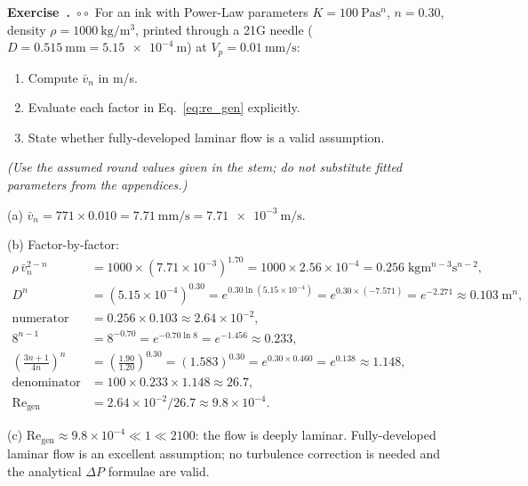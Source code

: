 \documentclass[11pt,a4paper]{article}
\newcommand{\diffB}{\textcolor{orange!80!black}{$\circ\circ$}}
\newcounter{exidx}[section]
\renewcommand{\theexidx}{\thesection.\arabic{exidx}}
\newenvironment{exercise}[1]%
  {\par\smallskip\refstepcounter{exidx}%
   \noindent\textbf{Exercise~\theexidx}~#1\quad}
  {\par\smallskip}
\newcommand{\Rey}{\mathrm{Re}}
\begin{document}
\begin{exercise}{\diffB}
For an ink with Power-Law parameters $K=\SI{100}{\Pa\s^n}$, $n=0.30$,
density $\rho=\SI{1000}{\kg/\m^3}$, printed through a 21G needle
($D=\SI{0.515}{\mm}=\SI{5.15e-4}{\m}$) at $V_p=\SI{0.01}{\mm/\s}$:
\begin{enumerate}[label=(\alph*),leftmargin=1.6em,itemsep=1pt]
  \item Compute $\bar v_n$ in \si{\m/\s}.
  \item Evaluate each factor in Eq.~\ref{eq:re_gen} explicitly.
  \item State whether fully-developed laminar flow is a valid assumption.
\end{enumerate}
\textit{(Use the assumed round values given in the stem; do not substitute
fitted parameters from the appendices.)}
\begin{solution}
(a) $\bar v_n = 771\times 0.010 = \SI{7.71}{\mm/\s} = \SI{7.71e-3}{\m/\s}$.

(b) Factor-by-factor:
\begin{align*}
\rho\,\bar v_n^{2-n}
  &= 1000\times(7.71\times10^{-3})^{1.70}
   = 1000\times 2.56\times10^{-4}
   = 0.256\;\si{\kg\m^{n-3}\s^{n-2}},\\
D^n &= (5.15\times10^{-4})^{0.30}
     = e^{0.30\ln(5.15\times10^{-4})}
     = e^{0.30\times(-7.571)}
     = e^{-2.271} \approx 0.103\;\si{\m^n},\\
\text{numerator} &= 0.256\times0.103 \approx 2.64\times10^{-2},\\[4pt]
8^{n-1} &= 8^{-0.70} = e^{-0.70\ln 8} = e^{-1.456} \approx 0.233,\\
\left(\frac{3n+1}{4n}\right)^n
  &= \left(\frac{1.90}{1.20}\right)^{0.30}
   = (1.583)^{0.30}
   = e^{0.30\times0.460}
   = e^{0.138} \approx 1.148,\\
\text{denominator} &= 100\times0.233\times1.148 \approx 26.7,\\[4pt]
\Rey_\mathrm{gen}
  &= 2.64\times10^{-2}/26.7 \approx 9.8\times10^{-4}.
\end{align*}

(c) $\Rey_\mathrm{gen}\approx 9.8\times10^{-4}\ll 1\ll 2100$: the flow is
deeply laminar. Fully-developed laminar flow is an excellent assumption;
no turbulence correction is needed and the analytical $\Delta P$ formulae
are valid.
\end{solution}
\end{exercise}
\end{document}
